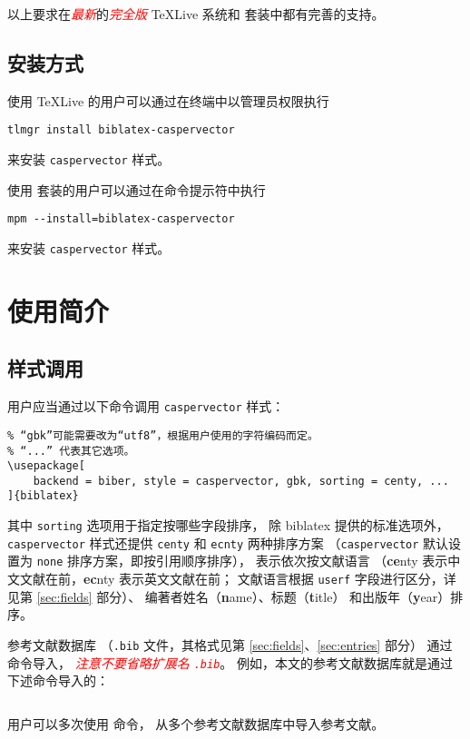 \documentclass[UTF8, fancyhdr, hyperref]{ctexart}
\newcommand{\myemph}[1]{\emph{\textcolor{red}{#1}}}
\begin{document}
以上要求在\myemph{最新}的\myemph{完全版}
\TeX{}Live 系统和 \CTeX{} 套装中都有完善的支持。

\subsection{安装方式}

使用 \TeX{}Live 的用户可以通过在终端中以管理员权限执行
\begin{Verbatim}[frame = single]
tlmgr install biblatex-caspervector
\end{Verbatim}
来安装 \verb|caspervector| 样式。

使用 \CTeX{} 套装的用户可以通过在命令提示符中执行
\begin{Verbatim}[frame = single]
mpm --install=biblatex-caspervector
\end{Verbatim}
来安装 \verb|caspervector| 样式。

\section{使用简介}
\subsection{样式调用}

用户应当通过以下命令调用 \verb|caspervector| 样式：
\begin{Verbatim}[frame = single]
% 如果系统上无法使用 biber，可将“biber”改为“bibtex”。
% “gbk”可能需要改为“utf8”，根据用户使用的字符编码而定。
% “...” 代表其它选项。
\usepackage[
	backend = biber, style = caspervector, gbk, sorting = centy, ...
]{biblatex}
\end{Verbatim}
其中 \verb|sorting| 选项用于指定按哪些字段排序，
除 biblatex 提供的标准选项\supercite{biblatex}外，
\verb|caspervector| 样式还提供 \verb|centy| 和 \verb|ecnty| 两种排序方案
（\verb|caspervector| 默认设置为 \verb|none| 排序方案，即按引用顺序排序），
表示依次按文献语言
（\textbf{ce}nty 表示中文文献在前，\textbf{ec}nty 表示英文文献在前；
文献语言根据 \verb|userf| 字段进行区分，详见第 \ref{sec:fields} 部分）、
编著者姓名（\textbf{n}ame）、标题（\textbf{t}itle）
和出版年（\textbf{y}ear）排序。

参考文献数据库
（\verb|.bib| 文件，其格式见第 \ref{sec:fields}、\ref{sec:entries} 部分）
通过 \verb|| 命令导入，%
\myemph{注意不要省略扩展名 \texttt{.bib}}。
例如，本文的参考文献数据库就是通过下述命令导入的：
\begin{Verbatim}[frame = single]

\end{Verbatim}
用户可以多次使用 \verb|| 命令，
从多个参考文献数据库中导入参考文献。
\end{document}

